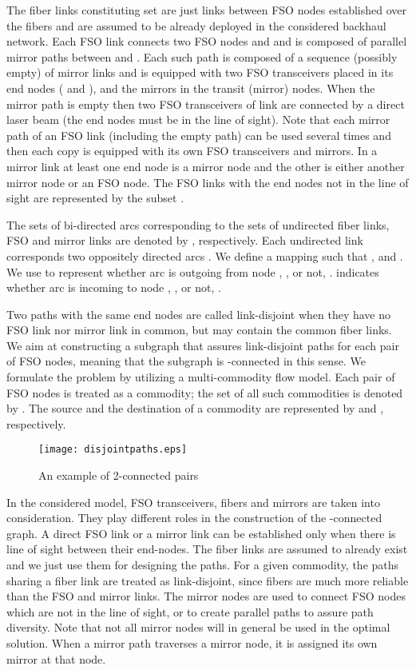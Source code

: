 \documentclass[onecolumn,11pt,draftclsnofoot]{IEEEtran}
\begin{document}
The fiber links constituting set  are just links between FSO nodes established over the fibers and are assumed to be already deployed in the considered backhaul network.
Each FSO link  connects two FSO nodes  and  and is composed of parallel mirror paths between  and . Each such path is composed of a sequence (possibly empty) of mirror links and is equipped with two FSO transceivers placed in its end nodes ( and ), and the mirrors in the transit (mirror) nodes. When the mirror path is empty then two FSO transceivers of link  are connected by a direct laser beam (the end nodes must be in the line of sight). Note that each mirror path of an FSO link (including the empty path) can be used several times and then each copy is equipped with its own FSO transceivers and mirrors. In a mirror link  at least one end node is a mirror node and the other is either another mirror node or an FSO node. The FSO links with the end nodes not in the line of sight are represented by the subset .

The sets of bi-directed arcs corresponding to the sets of undirected fiber links, FSO and mirror links are denoted by , respectively. Each undirected link  corresponds two oppositely directed arcs . We define a mapping  such that ,  and .
We use  to represent whether arc  is outgoing from node , , or not, .  indicates whether arc  is incoming to node , , or not, .

Two paths with the same end nodes are called link-disjoint when they have no FSO link nor mirror link in common, but may contain the common fiber links. We aim at constructing a subgraph that assures  link-disjoint paths for each pair of FSO nodes, meaning that the subgraph is -connected in this sense.
We formulate the problem by utilizing a multi-commodity flow model. Each pair of FSO nodes is treated as a commodity; the set of all such commodities is denoted by . The source and the destination of a commodity  are represented by  and , respectively.

\begin{figure}[!htbp]
\centering
\texttt{[image: disjointpaths.eps]}
\caption{An example of 2-connected pairs}
\label{fig:disjointpaths}
\end{figure}

In the considered model, FSO transceivers, fibers and mirrors are taken into consideration. They play different roles in the construction of the -connected graph. A direct FSO link or a mirror link can be established only when there is line of sight between their end-nodes. The fiber links are assumed to already exist and we just use them for designing the paths.
For a given commodity, the paths sharing a fiber link are treated as link-disjoint, since fibers are much more reliable than the FSO and mirror links. The mirror nodes are used to connect FSO nodes which are not in the line of sight, or to create parallel paths to assure path diversity. Note that not all mirror nodes will in general be used in the optimal solution. When a mirror path traverses a mirror node, it is assigned its own mirror at that node.
\end{document}
